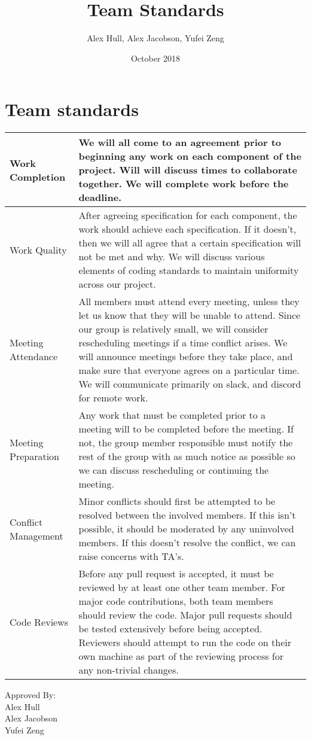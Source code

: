 \documentclass[draftclsnofoot,onecolumn,10pt]{IEEEtran}
\title{Team Standards}
\author{Alex Hull, Alex Jacobson, Yufei Zeng}
\date{October 2018}
\begin{document}
\maketitle

\section{Team standards}

\begin{center}
\begin{tabular}{ |p{5cm}||p{12cm}| } 
 \hline
 Work Completion & We will all come to an agreement prior to beginning any work on each component of the project. Will will discuss times to collaborate together. We will complete work before the deadline.  \\ 
 \hline
 Work Quality & After agreeing specification for each component, the work should achieve each specification. If it doesn't, then we will all agree that a certain specification will not be met and why. We will discuss various elements of coding standards to maintain uniformity across our project.  \\ 
 \hline
 Meeting Attendance & All members must attend every meeting, unless they let us know that they will be unable to attend. Since our group is relatively small, we will consider rescheduling meetings if a time conflict arises. We will announce meetings before they take place, and make sure that everyone agrees on a particular time. We will communicate primarily on slack, and discord for remote work. \\ 
 \hline
 Meeting Preparation & Any work that must be completed prior to a meeting will to be completed before the meeting. If not, the group member responsible must notify the rest of the group with as much notice as possible so we can discuss rescheduling or continuing the meeting. \\ 
 \hline
 Conflict Management & Minor conflicts should first be attempted to be resolved between the involved members. If this isn't possible, it should be moderated by any uninvolved members. If this doesn't resolve the conflict, we can raise concerns with TA's.  \\ 
 \hline
 Code Reviews & Before any pull request is accepted, it must be reviewed by at least one other team member. For major code contributions, both team members should review the code. Major pull requests should be tested extensively before being accepted. Reviewers should attempt to run the code on their own machine as part of the reviewing process for any non-trivial changes. \\ 
 \hline
\end{tabular}
\end{center}

Approved By:\\
Alex Hull\\
Alex Jacobson\\
Yufei Zeng
\end{document}
